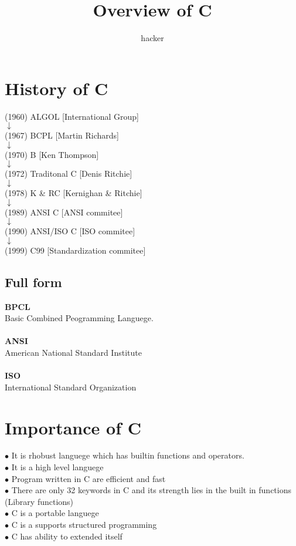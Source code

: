 \documentclass{article}
\date{}
\author{hacker}
\begin{document}
	\title{Overview of C}
	\maketitle

	\newpage
	
	\section{History of C}
	\begin{center}
		(1960) ALGOL [International Group] \\
		$ \downarrow $ \\
		(1967) BCPL [Martin Richards] \\ 
		$ \downarrow $ \\
		(1970) B [Ken Thompson] \\ 
		$ \downarrow $ \\
		(1972) Traditonal C [Denis Ritchie]\\ 
		$ \downarrow $ \\
		(1978) K \& RC [Kernighan \& Ritchie] \\ 
		$ \downarrow $ \\
		(1989) ANSI C [ANSI commitee] \\ 
		$ \downarrow $ \\
		(1990) ANSI/ISO C [ISO commitee] \\
		$ \downarrow $ \\
		(1999) C99 [Standardization commitee]
	\end{center}

	\subsection{Full form}
	\textbf{BPCL} \\
	Basic Combined Peogramming Languege. \\
	\\
	\textbf{ANSI} \\
	American National Standard Institute \\
	\\
	\textbf{ISO} \\
	International Standard Organization
	
	\section{Importance of C}
	$ \bullet $ It is rhobust languege which has builtin functions and operators. \\
	$ \bullet $ It is a high level languege \\
	$ \bullet $ Program written in C are efficient and fast \\
	$ \bullet $  There are only 32 keywords in C and its strength lies in the built in functions (Library functions) \\
	$ \bullet $ C is a portable languege \\
	$ \bullet $ C is a supports structured programming \\
	$ \bullet $ C has ability to extended itself \\
\end{document}
